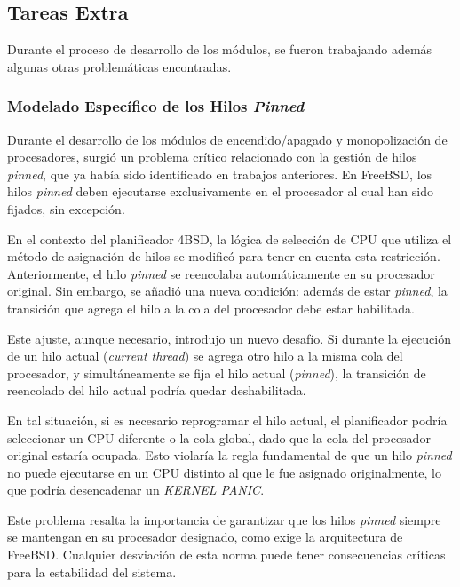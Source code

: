 \subsection{Tareas Extra}

Durante el proceso de desarrollo de los módulos, se fueron trabajando además algunas otras problemáticas encontradas.

\subsubsection{Modelado Específico de los Hilos \textit{Pinned}}

Durante el desarrollo de los módulos de encendido/apagado y monopolización de procesadores, surgió un problema crítico relacionado con la gestión de hilos \textit{pinned}, que ya había sido identificado en trabajos anteriores. En FreeBSD, los hilos \textit{pinned} deben ejecutarse exclusivamente en el procesador al cual han sido fijados, sin excepción.

En el contexto del planificador 4BSD, la lógica de selección de CPU que utiliza el método de asignación de hilos se modificó para tener en cuenta esta restricción. Anteriormente, el hilo \textit{pinned} se reencolaba automáticamente en su procesador original. Sin embargo, se añadió una nueva condición: además de estar \textit{pinned}, la transición que agrega el hilo a la cola del procesador debe estar habilitada.

Este ajuste, aunque necesario, introdujo un nuevo desafío. Si durante la ejecución de un hilo actual (\textit{current thread}) se agrega otro hilo a la misma cola del procesador, y simultáneamente se fija el hilo actual (\textit{pinned}), la transición de reencolado del hilo actual podría quedar deshabilitada.

En tal situación, si es necesario reprogramar el hilo actual, el planificador podría seleccionar un CPU diferente o la cola global, dado que la cola del procesador original estaría ocupada. Esto violaría la regla fundamental de que un hilo \textit{pinned} no puede ejecutarse en un CPU distinto al que le fue asignado originalmente, lo que podría desencadenar un \textit{KERNEL PANIC}.

Este problema resalta la importancia de garantizar que los hilos \textit{pinned} siempre se mantengan en su procesador designado, como exige la arquitectura de FreeBSD. Cualquier desviación de esta norma puede tener consecuencias críticas para la estabilidad del sistema.


